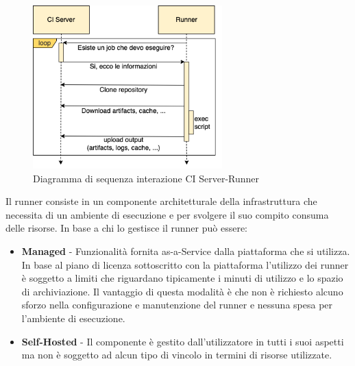 \begin{figure}[H]
    \centering
    \includegraphics[width=0.65\textwidth]{img/ciserver-runner.png}
    \caption{Diagramma di sequenza interazione CI Server-Runner}
    \label{ci-server-runner}
\end{figure}

Il runner consiste in un componente architetturale della infrastruttura che necessita di un ambiente di esecuzione e per svolgere il suo compito consuma delle risorse. In base a chi lo gestisce il runner può essere:

\begin{itemize}
    \item \textbf{Managed} - Funzionalità fornita as-a-Service dalla piattaforma che si utilizza. In base al piano di licenza sottoscritto con la piattaforma l'utilizzo dei runner è soggetto a limiti che riguardano tipicamente i minuti di utilizzo e lo spazio di archiviazione. Il vantaggio di questa modalità è che non è richiesto alcuno sforzo nella configurazione e manutenzione del runner e nessuna spesa per l'ambiente di esecuzione.
    \item \textbf{Self-Hosted} - Il componente è gestito dall'utilizzatore in tutti i suoi aspetti ma non è soggetto ad alcun tipo di vincolo in termini di risorse utilizzate.
\end{itemize}